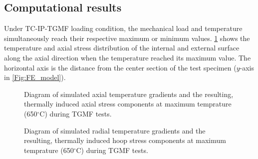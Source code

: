 \renewcommand\arraystretch{1}

\subsection{Computational results}
\noindent
Under TC-IP-TGMF loading condition, the mechanical load and temperature simultaneously reach their respective maximum or minimum values.
\ref{Fig:plot_temperature_along_gauge_length} shows the temperature and axial stress distribution of the internal and external surface along the axial direction when the temperature reached its maximum value.
The horizontal axis is the distance from the center section of the test specimen ($y$-axis in \ref{Fig:FE_model}). 


\begin{figure}[!htp]
\caption{Diagram of simulated axial temperature gradients and the resulting, thermally induced axial stress components at maximum temprature (650$^\circ$C) during TGMF tests.}
\label{Fig:plot_temperature_along_gauge_length}
\end{figure}


\begin{figure}[!htp]
\caption{Diagram of simulated radial temperature gradients and the resulting, thermally induced hoop stress components at maximum temprature (650$^\circ$C) during TGMF tests.}
\label{Fig:plot_temperature_along_radial_direction}
\end{figure}


